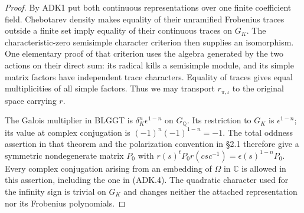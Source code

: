 \begin{proof}
By ADK1 put both continuous representations over one finite
coefficient field.  Chebotarev density makes equality of their
unramified Frobenius traces outside a finite set imply equality of
their continuous traces on $G_K$.  The characteristic-zero
semisimple character criterion then supplies an isomorphism.  One
elementary proof of that criterion uses the algebra generated by the
two actions on their direct sum: its radical kills a semisimple
module, and its simple matrix factors have independent trace
characters.  Equality of traces gives equal multiplicities of all
simple factors.  Thus we may transport $r_{\pi,\iota}$ to the
original space carrying $r$.

The Galois multiplier in BLGGT is
$\delta_K^n\epsilon^{1-n}$ on $G_{\mathbb Q}$.  Its restriction to
$G_K$ is $\epsilon^{1-n}$; its value at complex conjugation is
$(-1)^n(-1)^{1-n}=-1$.  The total oddness assertion in that theorem
and the polarization convention in \S2.1 therefore give a symmetric
nondegenerate matrix $P_0$ with
$r(s)^tP_0r(csc^{-1})=\epsilon(s)^{1-n}P_0$.
Every complex conjugation arising from an embedding of $\Omega$ in
$\mathbb C$ is allowed in this assertion, including the one in
(ADK.4).  The quadratic character used for the infinity sign is
trivial on $G_K$ and changes neither the attached representation nor
its Frobenius polynomials.
\end{proof}

